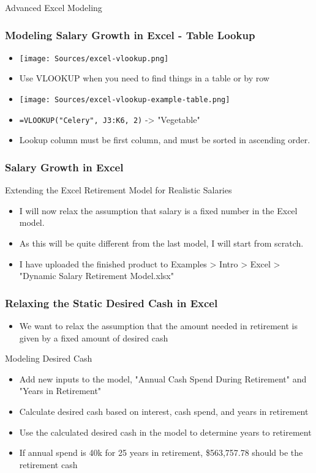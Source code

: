 \documentclass[handout, 11pt]{beamer}
\begin{document}
\begin{section}{Advanced Excel Modeling}
\begin{frame}
\frametitle{Modeling Salary Growth in Excel - Table Lookup}
\begin{itemize}
\item \texttt{[image: Sources/excel-vlookup.png]}
\vfill
\item Use VLOOKUP when you need to find things in a table or by row
\vfill
\item \texttt{[image: Sources/excel-vlookup-example-table.png]}
\vfill
\item \texttt{=VLOOKUP("Celery", J3:K6, 2)}
-> "Vegetable"
\vfill
\item Lookup column must be first column, and must be sorted in ascending order.
\end{itemize}
\end{frame}
\begin{frame}
\frametitle{Salary Growth in Excel}
{
\begin{block}{Extending the Excel Retirement Model for Realistic Salaries}
\begin{itemize}
\item I will now relax the assumption that salary is a fixed number in the Excel model.
\item As this will be quite different from the last model, I will start from scratch.
\item I have uploaded the finished product to Examples > Intro > Excel > "Dynamic Salary Retirement Model.xlsx"
\end{itemize}
\end{block}
}
\end{frame}
\begin{frame}
\frametitle{Relaxing the Static Desired Cash in Excel}
\begin{itemize}
\item We want to relax the assumption that the amount needed in retirement is given by a fixed amount of desired cash
\end{itemize}
\vfill
{
\begin{block}{Modeling Desired Cash}
\begin{itemize}
\item Add new inputs to the model, "Annual Cash Spend During Retirement" and "Years in Retirement"
\item Calculate desired cash based on interest, cash spend, and years in retirement
\item Use the calculated desired cash in the model to determine years to retirement
\item If annual spend is 40k for 25 years in retirement, \$563,757.78 should be the retirement cash
\end{itemize}
\vfill
\end{block}
}
\end{frame}
\end{section}
\end{document}
